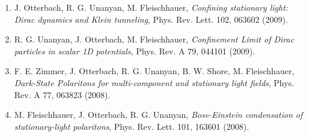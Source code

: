 \documentclass[10pt,centered]{./res} %
\begin{document}
\begin{resume}
\begin{enumerate}
  \item J. Otterbach, R. G. Unanyan, M. Fleischhauer, \textit{Confining stationary light: Dirac dynamics and Klein tunneling}, Phys. Rev. Lett. 102, 063602 (2009).

  \item R. G. Unanyan, J. Otterbach, M. Fleischhauer, \textit{Confinement Limit of Dirac particles in scalar 1D potentials}, Phys. Rev. A 79, 044101 (2009).

  \item F. E. Zimmer, J. Otterbach, R. G. Unanyan, B. W. Shore, M. Fleischhauer, \textit{Dark-State Polaritons for multi-component and stationary light fields}, Phys. Rev. A 77, 063823 (2008).

  \item M. Fleischhauer, J. Otterbach, R. G. Unanyan, \textit{Bose-Einstein condensation of stationary-light polaritons}, Phys. Rev. Lett. 101, 163601 (2008).

\end{enumerate}




\end{resume}
\end{document}
